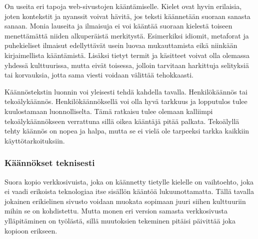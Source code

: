 \documentclass[11pt,a4paper,titlepage,oneside]{article}
\begin{document}





On useita eri tapoja web-sivustojen kääntämiselle.
Kielet ovat hyvin erilaisia, joten kontekstit ja nyanssit voivat hävitä, jos teksti käännetään suoraan sanasta sanaan.
Monia lauseita ja ilmaisuja ei voi kääntää suoraan kielestä toiseen menettämättä niiden alkuperäistä merkitystä.
Esimerkiksi idiomit, metaforat ja puhekieliset ilmaisut edellyttävät usein luovaa mukauttamista eikä niinkään kirjaimellista kääntämistä. 
Lisäksi tietyt termit ja käsitteet voivat olla olemassa yhdessä kulttuurissa, 
mutta eivät toisessa, jolloin tarvitaan harkittuja selityksiä tai korvauksia, jotta sama viesti voidaan välittää tehokkaasti.
\medskip



Käännöstekstin luonnin voi yleisesti tehdä kahdella tavalla. Henkilökäännös tai tekoälykäännös.
Henkilökäännöksellä voi olla hyvä tarkkuus ja lopputulos tulee kuulostamaan luonnolliselta.
Tämä ratkaisu tulee olemaan kalliimpi tekoälykäännökseen verrattuna sillä oikea kääntäjä pitää palkata.
Tekoälyllä tehty käännös on nopea ja halpa, mutta se ei vielä ole tarpeeksi tarkka kaikkiin käyttötarkoituksiin.
\medskip









\subsubsection{Käännökset teknisesti}








Suora kopio verkkosivuista, joka on käännetty tietylle kielelle
on vaihtoehto, joka ei vaadi erikoista teknologiaa itse sisällön kääntöä lukuunottamatta.
Tällä tavalla jokainen erikielinen sivusto voidaan muokata sopimaan juuri siihen kulttuuriin mihin se on kohdistettu.
Mutta monen eri version samasta verkkosivusta ylläpitäminen on työlästä, sillä muutoksien tekeminen pitäisi päivittää joka kopioon erikseen.
\medskip
\end{document}
